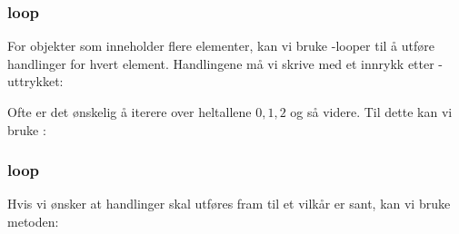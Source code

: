 \subsubsection{ loop}
For objekter som inneholder flere elementer, kan vi bruke -looper til å utføre handlinger for hvert element. Handlingene må vi skrive med et innrykk etter -uttrykket:
\vsk

Ofte er det ønskelig å iterere over heltallene $ 0, 1, 2 $ og så videre. Til dette kan vi bruke :
\subsubsection{ loop}
Hvis vi ønsker at handlinger skal utføres fram til et vilkår er sant, kan vi bruke  metoden: \regv
{}
\newpage



